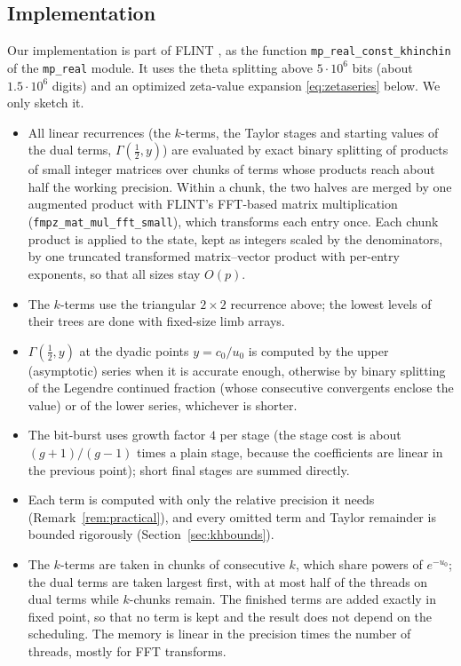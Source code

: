 \documentclass[11pt]{amsart}
\theoremstyle{definition}
\theoremstyle{remark}
\begin{document}
\subsection{Implementation}\label{sec:khimpl}
Our implementation is part of FLINT \cite{FLINT}, as the function
\texttt{mp\_real\_const\_khinchin} of the \texttt{mp\_real} module. It uses the theta splitting above
$5\cdot10^6$ bits (about $1.5\cdot10^6$ digits) and an optimized zeta-value expansion \eqref{eq:zetaseries} below.
We only sketch it.
\begin{itemize}
\item All linear recurrences (the $k$-terms, the Taylor stages and starting values of the dual terms,
$\Gamma(\frac12, y)$) are evaluated by exact binary splitting of products of small integer matrices over chunks of
terms whose products reach about half the working precision. Within a chunk, the two halves are merged by one
augmented product with FLINT's FFT-based matrix multiplication (\texttt{fmpz\_mat\_mul\_fft\_small}), which
transforms each entry once. Each chunk product is applied to the state, kept as integers scaled by the denominators,
by one truncated transformed matrix--vector product with per-entry exponents, so that all sizes stay $O(p)$.
\item The $k$-terms use the triangular $2\times2$ recurrence above; the lowest levels of their trees are done with
fixed-size limb arrays.
\item $\Gamma(\frac12, y)$ at the dyadic points $y = c_0/u_0$ is computed by the upper (asymptotic) series when it is
accurate enough, otherwise by binary splitting of the Legendre continued fraction (whose consecutive convergents
enclose the value) or of the lower series, whichever is shorter.
\item The bit-burst uses growth factor $4$ per stage (the stage cost is about $(g+1)/(g-1)$ times a plain stage,
because the coefficients are linear in the previous point); short final stages are summed directly.
\item Each term is computed with only the relative precision it needs (Remark~\ref{rem:practical}), and every omitted
term and Taylor remainder is bounded rigorously (Section~\ref{sec:khbounds}).
\item The $k$-terms are taken in chunks of consecutive $k$, which share powers of $e^{-u_0}$; the dual terms are taken
largest first, with at most half of the threads on dual terms while $k$-chunks remain. The finished terms are added
exactly in fixed point, so that no term is kept and the result does not depend on the scheduling. The memory is linear
in the precision times the number of threads, mostly for FFT transforms.
\end{itemize}
\end{document}
